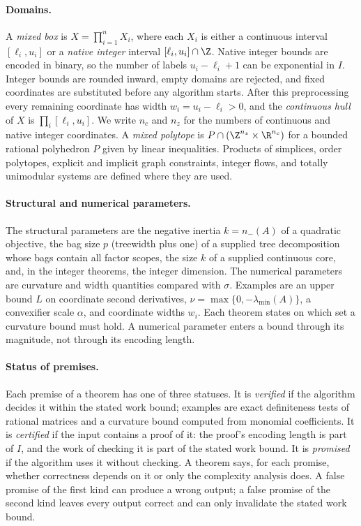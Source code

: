 \paragraph{Domains.}
A \emph{mixed box} is $X=\prod_{i=1}^nX_i$, where each $X_i$ is either a
continuous interval $[\ell_i,u_i]$ or a \emph{native integer} interval
$[\ell_i,u_i]\cap\Z$. Native integer bounds are encoded in binary, so the
number of labels $u_i-\ell_i+1$ can be exponential in $I$. Integer bounds
are rounded inward, empty domains are rejected, and fixed coordinates are
substituted before any algorithm starts. After this preprocessing every
remaining coordinate has width $w_i=u_i-\ell_i>0$, and the
\emph{continuous hull} of $X$ is $\prod_i[\ell_i,u_i]$. We write $n_c$ and
$n_z$ for the numbers of continuous and native integer coordinates. A
\emph{mixed polytope} is $P\cap(\Z^{n_z}\times\R^{n_c})$ for a bounded
rational polyhedron $P$ given by linear inequalities. Products of simplices,
order polytopes, explicit and implicit graph constraints, integer flows, and
totally unimodular systems are defined where they are used.

\paragraph{Structural and numerical parameters.}
The structural parameters are the negative inertia $k=n_-(A)$ of a quadratic
objective, the bag size $p$ (treewidth plus one) of a supplied tree
decomposition whose bags contain all factor scopes, the size $k$ of a
supplied continuous core, and, in the integer theorems, the integer
dimension. The numerical parameters are curvature and width quantities
compared with $\sigma$. Examples are an upper bound $L$ on coordinate second
derivatives, $\nu=\max\{0,-\lambda_{\min}(A)\}$, a convexifier scale
$\alpha$, and coordinate widths $w_i$. Each theorem states on which set a
curvature bound must hold. A numerical parameter enters a bound through its
magnitude, not through its encoding length.

\paragraph{Status of premises.}
Each premise of a theorem has one of three statuses. It is \emph{verified}
if the algorithm decides it within the stated work bound; examples are exact
definiteness tests of rational matrices and a curvature bound computed from
monomial coefficients. It is \emph{certified} if the input contains a proof
of it: the proof's encoding length is part of $I$, and the work of checking
it is part of the stated work bound. It is \emph{promised} if the algorithm
uses it without checking. A theorem says, for each promise, whether
correctness depends on it or only the complexity analysis does. A false
promise of the first kind can produce a wrong output; a false promise of the
second kind leaves every output correct and can only invalidate the stated
work bound.

